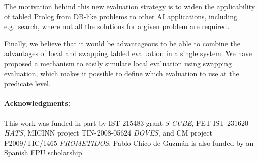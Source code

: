 \documentclass{./tlp}
\begin{document}
The motivation behind this new evaluation strategy is to widen the
applicability of tabled Prolog from DB-like problems to other AI
applications, including e.g.\ search, where not all the solutions for a
given problem are required.



Finally, we believe that it would be advantageous to be able
to combine the advantages of local and swapping tabled evaluation in a
single system.  We have proposed a mechanism to easily simulate local
evaluation using swapping evaluation, which makes it possible to
define which evaluation to use at the predicate level.




\paragraph{\textbf{Acknowledgments:}} 
This work was funded in part by
IST-215483 grant {\em S-CUBE}, FET IST-231620 {\em HATS}, MICINN
project TIN-2008-05624 {\em DOVES}, and CM project P2009/TIC/1465
\emph{PROMETIDOS}.  Pablo Chico de Guzm\'an is also funded by an
Spanish FPU scholarship.
 
 



\label{lastpage} 
 
\end{document}
